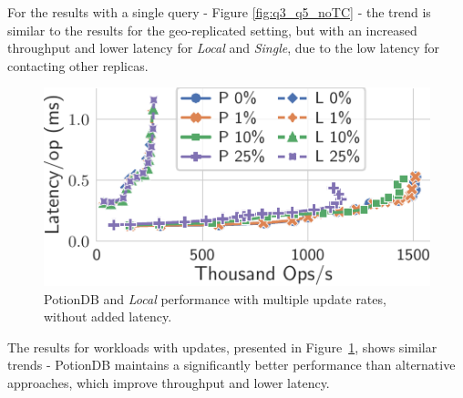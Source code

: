 \documentclass[sigplan,twocolumn,review,anonymous]{acmart}
\begin{document}
For the results with a single query - Figure \ref{fig:q3_q5_noTC} - the trend is similar to 
the results for the geo-replicated setting, but with an increased throughput and lower latency
for \textit{Local} and \textit{Single}, due to the low latency for contacting other replicas. 


\begin{figure}
	\centering
	\includegraphics[width=0.62\linewidth]{singleQuery/upd_rate_noTC_global_vs_local}
	\vspace*{-0.65em}
	\caption{PotionDB and \textit{Local} performance with multiple update rates, without added latency.}
	\label{fig:update_rates_global_vs_local_noTC}
	\vspace*{-1.3em}
\end{figure}

The results for workloads with updates, presented in Figure~\ref{fig:update_rates_global_vs_local_noTC}, 
shows similar trends - PotionDB maintains a significantly better performance than alternative
approaches, which improve throughput and lower latency.  
\end{document}
